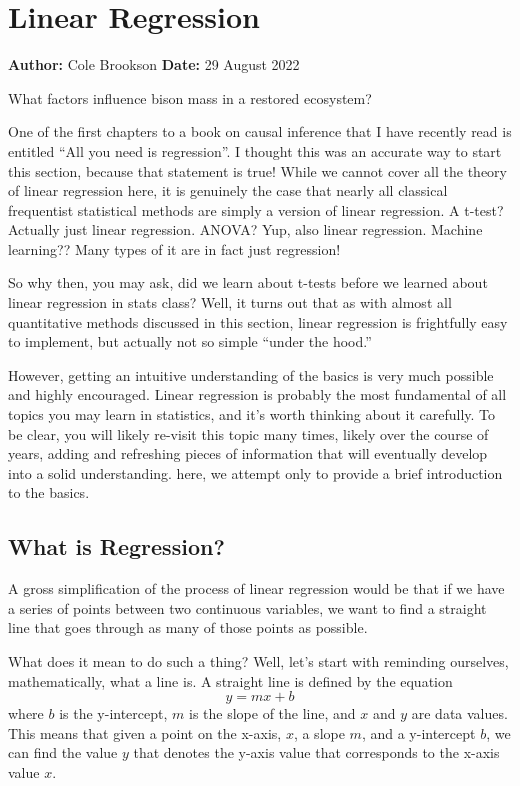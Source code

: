 \documentclass[
]{article}
\author{}
\date{\vspace{-2.5em}}
\begin{document}
\hypertarget{linear-regression}{%
\section{Linear Regression}\label{linear-regression}}

\textbf{Author:} Cole Brookson \textbf{Date:} 29 August 2022

What factors influence bison mass in a restored ecosystem?

One of the first chapters to a book on causal inference that I have
recently read is entitled ``All you need is regression''. I thought this
was an accurate way to start this section, because that statement is
true! While we cannot cover all the theory of linear regression here, it
is genuinely the case that nearly all classical frequentist statistical
methods are simply a version of linear regression. A t-test? Actually
just linear regression. ANOVA? Yup, also linear regression. Machine
learning?? Many types of it are in fact just regression!

So why then, you may ask, did we learn about t-tests before we learned
about linear regression in stats class? Well, it turns out that as with
almost all quantitative methods discussed in this section, linear
regression is frightfully easy to implement, but actually not so simple
``under the hood.''

However, getting an intuitive understanding of the basics is very much
possible and highly encouraged. Linear regression is probably the most
fundamental of all topics you may learn in statistics, and it's worth
thinking about it carefully. To be clear, you will likely re-visit this
topic many times, likely over the course of years, adding and refreshing
pieces of information that will eventually develop into a solid
understanding. here, we attempt only to provide a brief introduction to
the basics.

\hypertarget{what-is-regression}{%
\subsection{What is Regression?}\label{what-is-regression}}

A gross simplification of the process of linear regression would be that
if we have a series of points between two continuous variables, we want
to find a straight line that goes through as many of those points as
possible.

What does it mean to do such a thing? Well, let's start with reminding
ourselves, mathematically, what a line is. A straight line is defined by
the equation \[y = mx + b\] where \(b\) is the y-intercept, \(m\) is the
slope of the line, and \(x\) and \(y\) are data values. This means that
given a point on the x-axis, \(x\), a slope \(m\), and a y-intercept
\(b\), we can find the value \(y\) that denotes the y-axis value that
corresponds to the x-axis value \(x\).
\end{document}
